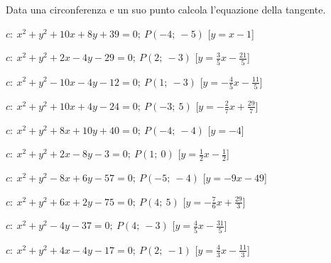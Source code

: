 \begin{esercizio}\label{ese:}
 Data una circonferenza e un suo punto calcola l'equazione della tangente.
 \begin{enumeratea}
  \item  \(c:~x^2 + y^2 +10x +8y +39 = 0;~P \left (-4;~-5 \right )\)
   \hfill [\(y = x -1\)]
  \item  \(c:~x^2 + y^2 +2x -4y -29 = 0;~P \left (2;~-3 \right )\)
   \hfill [\(y = \frac{3}{5} x -\frac{21}{5}\)]
  \item  \(c:~x^2 + y^2 -10x -4y -12 = 0;~P \left (1;~-3 \right )\)
   \hfill [\(y = -\frac{4}{5} x -\frac{11}{5}\)]
  \item  \(c:~x^2 + y^2 +10x +4y -24 = 0;~P \left (-3;~5 \right )\)
   \hfill [\(y = -\frac{2}{7} x +\frac{29}{7}\)]
  \item  \(c:~x^2 + y^2 +8x +10y +40 = 0;~P \left (-4;~-4 \right )\)
   \hfill [\(y = -4\)]
  \item  \(c:~x^2 + y^2 +2x -8y -3 = 0;~P \left (1;~0 \right )\)
   \hfill [\(y = \frac{1}{2} x -\frac{1}{2}\)]
  \item  \(c:~x^2 + y^2 -8x +6y -57 = 0;~P \left (-5;~-4 \right )\)
   \hfill [\(y = -9 x -49\)]
  \item  \(c:~x^2 + y^2 +6x +2y -75 = 0;~P \left (4;~5 \right )\)
   \hfill [\(y = -\frac{7}{6} x +\frac{29}{3}\)]
  \item  \(c:~x^2 + y^2 -4y -37 = 0;~P \left (4;~-3 \right )\)
   \hfill [\(y = \frac{4}{5} x -\frac{31}{5}\)]
  \item  \(c:~x^2 + y^2 +4x -4y -17 = 0;~P \left (2;~-1 \right )\)
   \hfill [\(y = \frac{4}{3} x -\frac{11}{3}\)]
 \end{enumeratea}
\end{esercizio}


